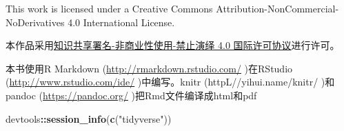 \documentclass[]{book}
\newenvironment{Shaded}{\begin{snugshade}}{\end{snugshade}}
\newcommand{\KeywordTok}[1]{\textcolor[rgb]{0.13,0.29,0.53}{\textbf{#1}}}
\newcommand{\NormalTok}[1]{#1}
\newcommand{\OperatorTok}[1]{\textcolor[rgb]{0.81,0.36,0.00}{\textbf{#1}}}
\newcommand{\StringTok}[1]{\textcolor[rgb]{0.31,0.60,0.02}{#1}}
\begin{document}
This work is licensed under a Creative Commons Attribution-NonCommercial-NoDerivatives 4.0 International License.
\doclicenseThis

本作品采用\href{https://creativecommons.org/licenses/by-nc-nd/4.0/deed.zh}{知识共享署名-非商业性使用-禁止演绎 4.0 国际许可协议}进行许可。

本书使用R Markdown (\url{http://rmarkdown.rstudio.com/} )在RStudio (\url{http://www.rstudio.com/ide/} )中编写。knitr (httpL//yihui.name/knitr/ )和pandoc (\url{https://pandoc.org/} )把Rmd文件编译成html和pdf

\begin{Shaded}
\begin{Highlighting}[]
\NormalTok{devtools}\OperatorTok{::}\KeywordTok{session_info}\NormalTok{(}\KeywordTok{c}\NormalTok{(}\StringTok{"tidyverse"}\NormalTok{))}
\end{Highlighting}
\end{Shaded}
\end{document}
